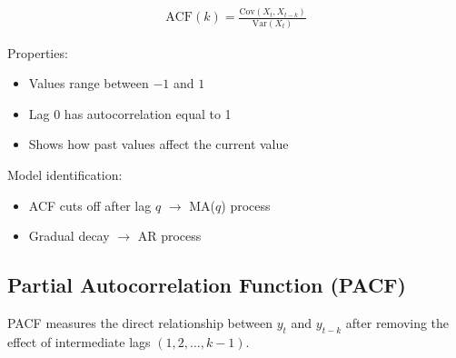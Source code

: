 \documentclass[10pt,a4paper]{article}
\begin{document}
	\begin{align*}
	\text{ACF}(k) = \frac{\text{Cov}(X_t, X_{t-k})}{\text{Var}(X_t)}
	\end{align*}
	
	Properties:
	\begin{itemize}
	\item Values range between $-1$ and $1$
	\item Lag 0 has autocorrelation equal to 1
	\item Shows how past values affect the current value
	\end{itemize}
	
	
	
	
	Model identification:
	\begin{itemize}
	\item ACF cuts off after lag $q$ $\rightarrow$ MA($q$) process
	\item Gradual decay $\rightarrow$ AR process
	\end{itemize}
	
	
	\subsection{Partial Autocorrelation Function (PACF)}
	
	PACF measures the direct relationship between $y_t$ and $y_{t-k}$ after removing the effect of intermediate lags $(1,2,\dots,k-1)$.
	
\end{document}
